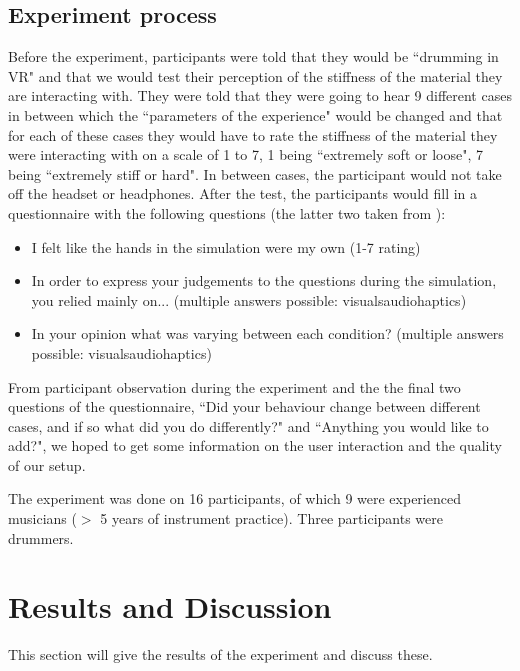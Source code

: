 \documentclass{vgtc}
\begin{document}
\subsection{Experiment process}
Before the experiment, participants were told that they would be ``drumming in VR" and that we would test their perception of the stiffness of the material they are interacting with. They were told that they were going to hear 9 different cases in between which the ``parameters of the experience" would be changed and that for each of these cases they would have to rate the stiffness of the material they were interacting with on a scale of 1 to 7, 1 being ``extremely soft or loose", 7 being ``extremely stiff or hard". In between cases, the participant would not take off the headset or headphones. After the test, the participants would fill in a questionnaire with the following questions (the latter two taken from \cite{avanzini2006}):

\begin{itemize}
    \item I felt like the hands in the simulation were my own (1-7 rating)
    \item In order to express your judgements to the questions during the simulation, you relied mainly on... \cite{avanzini2006} (multiple answers possible: visuals\textbar audio\textbar haptics)
    \item In your opinion what was varying between each condition? \cite{avanzini2006} (multiple answers possible: visuals\textbar audio\textbar haptics)
\end{itemize}
From participant observation during the experiment and the the final two questions of the questionnaire, ``Did your behaviour change between different cases, and if so what did you do differently?" and ``Anything you would like to add?", we hoped to get some information on the user interaction and the quality of our setup.

The experiment was done on 16 participants, of which 9 were experienced musicians ($>$ 5 years of instrument practice). Three participants were drummers. 

\section{Results and Discussion}\label{sec:resDisc}
This section will give the results of the experiment and discuss these.
\end{document}
